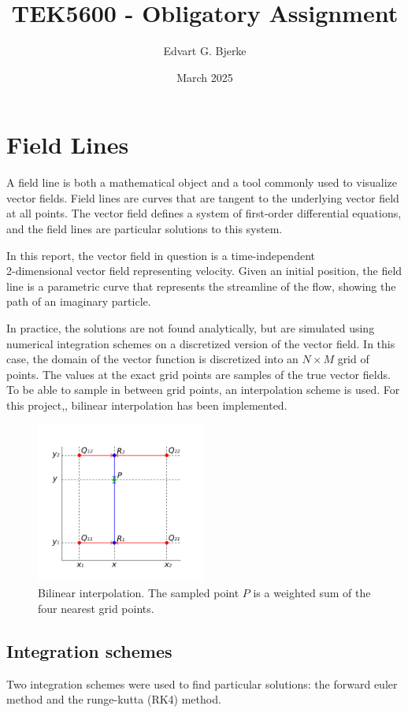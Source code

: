 \documentclass{article}
\title{TEK5600 - Obligatory Assignment}
\author{Edvart G. Bjerke}
\date{March 2025}
\begin{document}
\maketitle

\section{Field Lines}
A field line is both a mathematical object and a tool commonly used to visualize
vector fields. Field lines are curves that are tangent to the underlying vector field
at all points. The vector field defines a system of first-order differential equations, and the field lines are particular solutions to this system.

In this report, the vector field in question is a time-independent \\
2-dimensional vector field representing velocity.
Given an initial position, the field line is a parametric curve that represents the streamline of the flow, showing the path of an imaginary particle.

In practice, the solutions are not found analytically, but are simulated using 
numerical integration schemes on a discretized version of the vector field.
In this case, the domain of the vector function is discretized into an $N \times M$ grid of points.
The values at the exact grid points are samples of the true vector fields. To be able to
sample in between grid points, an interpolation scheme is used. For this project,, bilinear interpolation has been implemented. 

\begin{figure}[h!]
    \centering
    \includegraphics[width=0.5\textwidth]{BilinearInterpolationV2.svg.png}
    \caption{Bilinear interpolation. The sampled point $P$ is a weighted sum of the four nearest grid points.}
\end{figure}

\subsection{Integration schemes}
Two integration schemes were used to find particular solutions: the forward euler method and the runge-kutta (RK4) method.
\end{document}
